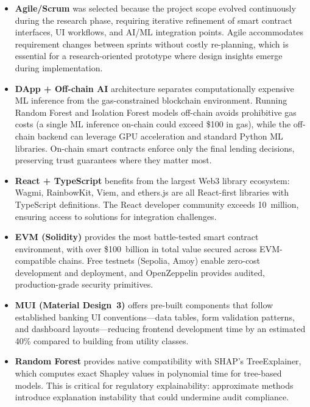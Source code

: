 \documentclass[12pt,a4paper]{report}
\begin{document}
\begin{itemize}[noitemsep]
\item \textbf{Agile/Scrum} was selected because the project scope evolved continuously during the research phase, requiring iterative refinement of smart contract interfaces, UI workflows, and AI/ML integration points. Agile accommodates requirement changes between sprints without costly re-planning, which is essential for a research-oriented prototype where design insights emerge during implementation.

\item \textbf{DApp + Off-chain AI} architecture separates computationally expensive ML inference from the gas-constrained blockchain environment. Running Random Forest and Isolation Forest models off-chain avoids prohibitive gas costs (a single ML inference on-chain could exceed \$100 in gas), while the off-chain backend can leverage GPU acceleration and standard Python ML libraries. On-chain smart contracts enforce only the final lending decisions, preserving trust guarantees where they matter most.

\item \textbf{React + TypeScript} benefits from the largest Web3 library ecosystem: Wagmi, RainbowKit, Viem, and ethers.js are all React-first libraries with TypeScript definitions. The React developer community exceeds 10~million, ensuring access to solutions for integration challenges.

\item \textbf{EVM (Solidity)} provides the most battle-tested smart contract environment, with over \$100~billion in total value secured across EVM-compatible chains. Free testnets (Sepolia, Amoy) enable zero-cost development and deployment, and OpenZeppelin provides audited, production-grade security primitives.

\item \textbf{MUI (Material Design~3)} offers pre-built components that follow established banking UI conventions---data tables, form validation patterns, and dashboard layouts---reducing frontend development time by an estimated 40\% compared to building from utility classes.

\item \textbf{Random Forest} provides native compatibility with SHAP's TreeExplainer, which computes exact Shapley values in polynomial time for tree-based models. This is critical for regulatory explainability: approximate methods introduce explanation instability that could undermine audit compliance.


\end{itemize}
\end{document}
